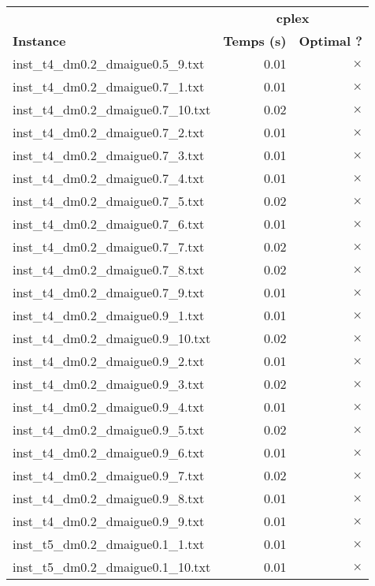 \documentclass{article}
\begin{document}
\newpage
\begin{center}
\renewcommand{\arraystretch}{1.4} 
 \begin{tabular}{lrr}
	\hline
 & \multicolumn{2}{c}{\textbf{cplex}}\\
\textbf{Instance}  & \textbf{Temps (s)} & \textbf{Optimal ?} \\\hline

inst\_t4\_dm0.2\_dmaigue0.5\_9.txt & 0.01 & 
$\times$
\\
inst\_t4\_dm0.2\_dmaigue0.7\_1.txt & 0.01 & 
$\times$
\\
inst\_t4\_dm0.2\_dmaigue0.7\_10.txt & 0.02 & 
$\times$
\\
inst\_t4\_dm0.2\_dmaigue0.7\_2.txt & 0.01 & 
$\times$
\\
inst\_t4\_dm0.2\_dmaigue0.7\_3.txt & 0.01 & 
$\times$
\\
inst\_t4\_dm0.2\_dmaigue0.7\_4.txt & 0.01 & 
$\times$
\\
inst\_t4\_dm0.2\_dmaigue0.7\_5.txt & 0.02 & 
$\times$
\\
inst\_t4\_dm0.2\_dmaigue0.7\_6.txt & 0.01 & 
$\times$
\\
inst\_t4\_dm0.2\_dmaigue0.7\_7.txt & 0.02 & 
$\times$
\\
inst\_t4\_dm0.2\_dmaigue0.7\_8.txt & 0.02 & 
$\times$
\\
inst\_t4\_dm0.2\_dmaigue0.7\_9.txt & 0.01 & 
$\times$
\\
inst\_t4\_dm0.2\_dmaigue0.9\_1.txt & 0.01 & 
$\times$
\\
inst\_t4\_dm0.2\_dmaigue0.9\_10.txt & 0.02 & 
$\times$
\\
inst\_t4\_dm0.2\_dmaigue0.9\_2.txt & 0.01 & 
$\times$
\\
inst\_t4\_dm0.2\_dmaigue0.9\_3.txt & 0.02 & 
$\times$
\\
inst\_t4\_dm0.2\_dmaigue0.9\_4.txt & 0.01 & 
$\times$
\\
inst\_t4\_dm0.2\_dmaigue0.9\_5.txt & 0.02 & 
$\times$
\\
inst\_t4\_dm0.2\_dmaigue0.9\_6.txt & 0.01 & 
$\times$
\\
inst\_t4\_dm0.2\_dmaigue0.9\_7.txt & 0.02 & 
$\times$
\\
inst\_t4\_dm0.2\_dmaigue0.9\_8.txt & 0.01 & 
$\times$
\\
inst\_t4\_dm0.2\_dmaigue0.9\_9.txt & 0.01 & 
$\times$
\\
inst\_t5\_dm0.2\_dmaigue0.1\_1.txt & 0.01 & 
$\times$
\\
inst\_t5\_dm0.2\_dmaigue0.1\_10.txt & 0.01 & 
$\times$
\\

\end{tabular}
\end{center}
\end{document}
